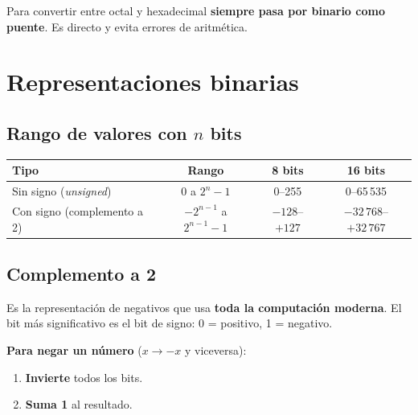 \documentclass[12pt, oneside]{article}
\begin{document}
\begin{consejo}
  Para convertir entre octal y hexadecimal \textbf{siempre pasa por binario
  como puente}. Es directo y evita errores de aritmética.
\end{consejo}

\newpage

\section{Representaciones binarias}

\subsection{Rango de valores con $n$ bits}

\begin{center}
\begin{tabular}{lccc}
  \toprule
  \textbf{Tipo} & \textbf{Rango} & \textbf{8 bits} & \textbf{16 bits} \\
  \midrule
  Sin signo (\textit{unsigned}) &
    $0$ \; a \; $2^n - 1$ & 0–255 & 0–65\,535 \\
  Con signo (complemento a 2) &
    $-2^{n-1}$ \; a \; $2^{n-1}-1$ & $-128$–$+127$ & $-32\,768$–$+32\,767$ \\
  \bottomrule
\end{tabular}
\end{center}

\subsection{Complemento a 2}

Es la representación de negativos que usa \textbf{toda la computación moderna}.
El bit más significativo es el bit de signo: 0 = positivo, 1 = negativo.

\textbf{Para negar un número} ($x \to -x$ y viceversa):
\begin{enumerate}
  \item \textbf{Invierte} todos los bits.
  \item \textbf{Suma 1} al resultado.
\end{enumerate}
\end{document}
